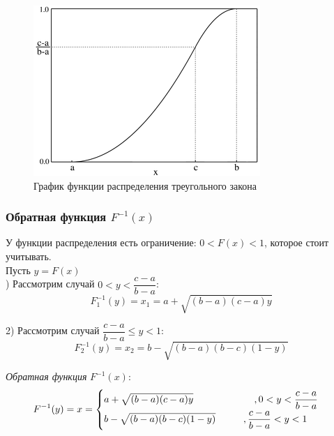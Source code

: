 \documentclass[14pt,fleqn]{extarticle}
\begin{document}
    \newpage
    \begin{figure}[h]
        \centering \includegraphics[scale=0.8]{plot2}
        \caption{График функции распределения треугольного закона}
    \end{figure}

    \subsubsection*{Обратная функция $F^{-1}(x)$}
    
    У функции распределения есть ограничение: $0 < F(x) < 1$, которое стоит учитывать.\\
    Пусть $y = F(x)$\\
    ) Рассмотрим случай $0 < y < \dfrac{c-a}{b-a}$:
    \[ F_1^{-1}(y) = x_1 = a + \sqrt{(b-a)(c-a)y} \]
    
    2) Рассмотрим случай $\dfrac{c-a}{b-a} \leq y < 1$:
    \[ F_2^{-1}(y) = x_2 = b - \sqrt{(b-a)(b-c)(1-y)} \]

    \textit{Обратная функция} $F^{-1}(x)$:
    \begin{align*}
        F^{-1}(y) = x =
        \begin{cases}
            a + \sqrt{(b-a)(c-a)y} \hspace{2.2cm} , 0 < y < \dfrac{c-a}{b-a}\\
            b - \sqrt{(b-a)(b-c)(1-y)} \hspace{1cm} , \dfrac{c-a}{b-a} < y < 1\\
        \end{cases}
    \end{align*}
\end{document}
